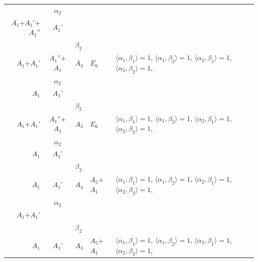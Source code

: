 \documentclass[12pt]{report}
\begin{document}
\begin{appendix}
{\begin{longtable}{rcl p{1cm}p{1cm}p{3cm} }
\\
\begin{tabular}{cc}$\alpha_1$+ & $\alpha_2$\\\tiny{ $A_1$+$A_1$'+$A_1$'' } & \tiny{ $A_1$' }\end{tabular} &\begin{tabular}{c} = \\~ \end{tabular} & \begin{tabular}{cc}$\beta_1$+ & $\beta_2$\\\tiny{ $A_1$+$A_1$' } & \tiny{ $A_1$''+$A_1$ }\end{tabular} & $A_3$ & $E_6$ &  $\langle\alpha_1, \beta_1\rangle=1$, $\langle\alpha_1, \beta_2\rangle=1$, $\langle\alpha_2, \beta_1\rangle=1$, $\langle\alpha_2, \beta_2\rangle=1$, 
\\
\begin{tabular}{cc}$\alpha_1$+ & $\alpha_2$\\\tiny{ $A_1$ } & \tiny{ $A_1$' }\end{tabular} &\begin{tabular}{c} = \\~ \end{tabular} & \begin{tabular}{cc}$\beta_1$+ & $\beta_2$\\\tiny{ $A_1$+$A_1$' } & \tiny{ $A_1$''+$A_1$ }\end{tabular} & $A_3$ & $E_6$ &  $\langle\alpha_1, \beta_1\rangle=1$, $\langle\alpha_1, \beta_2\rangle=1$, $\langle\alpha_2, \beta_1\rangle=1$, $\langle\alpha_2, \beta_2\rangle=1$, 
\\
\begin{tabular}{cc}$\alpha_1$+ & $\alpha_2$\\\tiny{ $A_1$ } & \tiny{ $A_1$' }\end{tabular} &\begin{tabular}{c} = \\~ \end{tabular} & \begin{tabular}{cc}$\beta_1$+ & $\beta_2$\\\tiny{ $A_1$ } & \tiny{ $A_1$' }\end{tabular} & $A_3$ & $A_5$+$A_1$ &  $\langle\alpha_1, \beta_1\rangle=1$, $\langle\alpha_1, \beta_2\rangle=1$, $\langle\alpha_2, \beta_1\rangle=1$, $\langle\alpha_2, \beta_2\rangle=1$, 
\\
\begin{tabular}{cc}$\alpha_1$+ & $\alpha_2$\\\tiny{ $A_1$+$A_1$' } & \tiny{  }\end{tabular} &\begin{tabular}{c} = \\~ \end{tabular} & \begin{tabular}{cc}$\beta_1$+ & $\beta_2$\\\tiny{ $A_1$ } & \tiny{ $A_1$' }\end{tabular} & $A_3$ & $A_5$+$A_1$ &  $\langle\alpha_1, \beta_1\rangle=1$, $\langle\alpha_1, \beta_2\rangle=1$, $\langle\alpha_2, \beta_1\rangle=1$, $\langle\alpha_2, \beta_2\rangle=1$, 

\end{longtable}}
\end{appendix}
\end{document}
